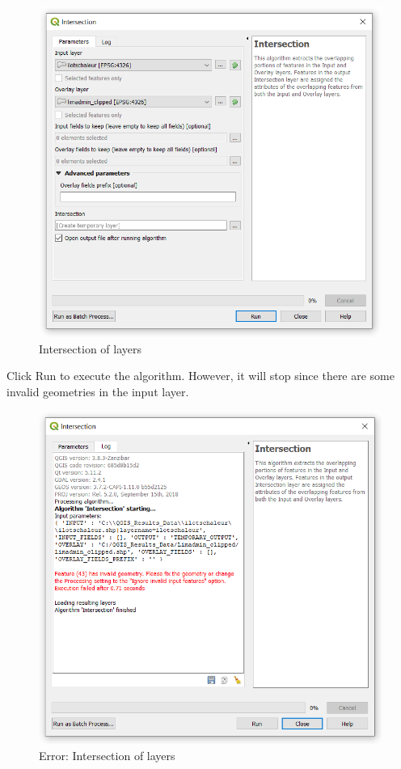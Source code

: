 \documentclass[]{book}
\theoremstyle{definition}
\theoremstyle{definition}
\theoremstyle{definition}
\theoremstyle{remark}
\begin{document}
\begin{figure}

{\centering \includegraphics[width=10.64in]{figures/Intersection_UHA} 

}

\caption{Intersection of layers}\label{fig:unnamed-chunk-28}
\end{figure}

Click Run to execute the algorithm. However, it will stop since there
are some invalid geometries in the input layer.

\begin{figure}

{\centering \includegraphics[width=10.54in]{figures/Intersection_UHA_Error} 

}

\caption{Error: Intersection of layers}\label{fig:unnamed-chunk-29}
\end{figure}
\end{document}
